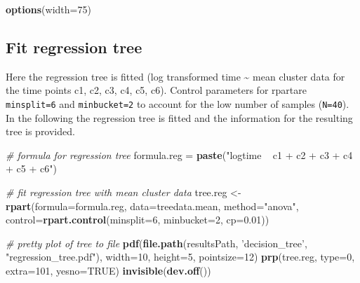 \documentclass[]{article}
\newenvironment{Shaded}{\begin{snugshade}}{\end{snugshade}}
\newcommand{\KeywordTok}[1]{\textcolor[rgb]{0.13,0.29,0.53}{\textbf{{#1}}}}
\newcommand{\DataTypeTok}[1]{\textcolor[rgb]{0.13,0.29,0.53}{{#1}}}
\newcommand{\DecValTok}[1]{\textcolor[rgb]{0.00,0.00,0.81}{{#1}}}
\newcommand{\FloatTok}[1]{\textcolor[rgb]{0.00,0.00,0.81}{{#1}}}
\newcommand{\StringTok}[1]{\textcolor[rgb]{0.31,0.60,0.02}{{#1}}}
\newcommand{\CommentTok}[1]{\textcolor[rgb]{0.56,0.35,0.01}{\textit{{#1}}}}
\newcommand{\OtherTok}[1]{\textcolor[rgb]{0.56,0.35,0.01}{{#1}}}
\newcommand{\NormalTok}[1]{{#1}}
\begin{document}
\begin{Shaded}
\begin{Highlighting}[]
\KeywordTok{options}\NormalTok{(}\DataTypeTok{width=}\DecValTok{75}\NormalTok{)}
\end{Highlighting}
\end{Shaded}

\normalsize

\subsection{Fit regression tree}\label{fit-regression-tree}

Here the regression tree is fitted (log transformed time
\textasciitilde{} mean cluster data for the time points c1, c2, c3, c4,
c5, c6). Control parameters for rpartare \texttt{minsplit=6} and
\texttt{minbucket=2} to account for the low number of samples
(\texttt{N=40}). In the following the regression tree is fitted and the
information for the resulting tree is provided.

\begin{Shaded}
\begin{Highlighting}[]
\CommentTok{# formula for regression tree}
\NormalTok{formula.reg =}\StringTok{ }\KeywordTok{paste}\NormalTok{(}\StringTok{"logtime ~ c1 + c2 + c3 + c4 + c5 + c6"}\NormalTok{)}

\CommentTok{# fit regression tree with mean cluster data}
\NormalTok{tree.reg <-}\StringTok{ }\KeywordTok{rpart}\NormalTok{(}\DataTypeTok{formula=}\NormalTok{formula.reg, }
                  \DataTypeTok{data=}\NormalTok{treedata.mean, }
                  \DataTypeTok{method=}\StringTok{"anova"}\NormalTok{, }
                  \DataTypeTok{control=}\KeywordTok{rpart.control}\NormalTok{(}\DataTypeTok{minsplit=}\DecValTok{6}\NormalTok{, }\DataTypeTok{minbucket=}\DecValTok{2}\NormalTok{, }\DataTypeTok{cp=}\FloatTok{0.01}\NormalTok{))}

\CommentTok{# pretty plot of tree to file}
\KeywordTok{pdf}\NormalTok{(}\KeywordTok{file.path}\NormalTok{(resultsPath, }\StringTok{'decision_tree'}\NormalTok{, }\StringTok{"regression_tree.pdf"}\NormalTok{), }
    \DataTypeTok{width=}\DecValTok{10}\NormalTok{, }\DataTypeTok{height=}\DecValTok{5}\NormalTok{, }\DataTypeTok{pointsize=}\DecValTok{12}\NormalTok{)  }
\KeywordTok{prp}\NormalTok{(tree.reg, }\DataTypeTok{type=}\DecValTok{0}\NormalTok{, }\DataTypeTok{extra=}\DecValTok{101}\NormalTok{, }\DataTypeTok{yesno=}\OtherTok{TRUE}\NormalTok{)}
\KeywordTok{invisible}\NormalTok{(}\KeywordTok{dev.off}\NormalTok{())}
\end{Highlighting}
\end{Shaded}
\end{document}
